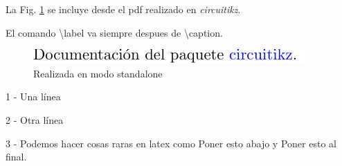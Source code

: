 \documentclass[11pt, a4paper]{article}
\begin{document}
La Fig. \ref{fig2} se incluye desde el pdf realizado en \textit{circuitikz}. 
\vspace{1em}

El comando \textbackslash label va siempre despues de \textbackslash caption.
\begin{figure}[h!]
	\centering
	\includegraphics[page=2]{../5-circuitikz/circuitikz.pdf}
	\caption{Realizada en modo standalone}
	\label{fig2}
\end{figure}

1 - Una línea

2 - Otra línea

3 - Podemos hacer cosas raras en latex como
\vfill
Poner esto abajo \hfill y \hfill Poner esto al final.
\end{document}
